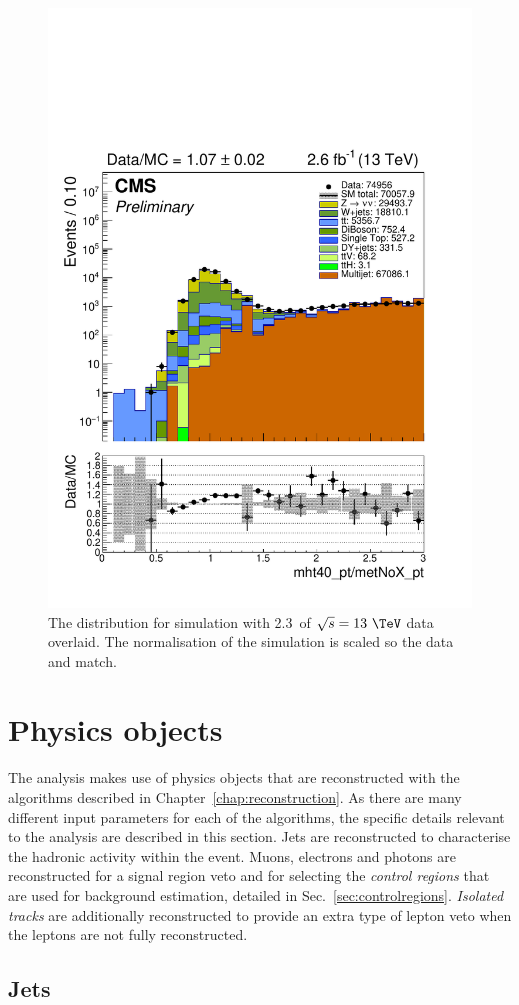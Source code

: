 \begin{figure}
	\begin{center}
		\includegraphics[width=0.5\linewidth]{figs/analysis/eventSelection/mht40_pt_Div_metNoX_pt_all_all_80X_noOverflow_scaled0p6}%
	\end{center}
  \caption{The \mhtmet distribution for \MC simulation with
  2.3~\ifb of $\sqrt{s}=13~\tev$ data overlaid. The
  normalisation of the \MC simulation is scaled so the data and \MC
  match.}
	\label{fig:mhtDivMet}
\end{figure}

\section{Physics objects} %
\label{sec:physobj}

The analysis makes use of physics objects that are reconstructed with
the algorithms described in Chapter~\ref{chap:reconstruction}. As
there are many different input parameters for each of the
algorithms, the specific details relevant to the analysis are
described in this section. Jets are reconstructed to characterise the
hadronic activity within the event. Muons, electrons and photons are
reconstructed for a signal region veto and for selecting the \emph{control
regions} that are used for background estimation, detailed in
Sec.~\ref{sec:controlregions}. \emph{Isolated tracks} are additionally
reconstructed to provide an extra type of lepton veto when the leptons
are not fully reconstructed.

\subsection{Jets}
\label{sec:evSel_jets}

